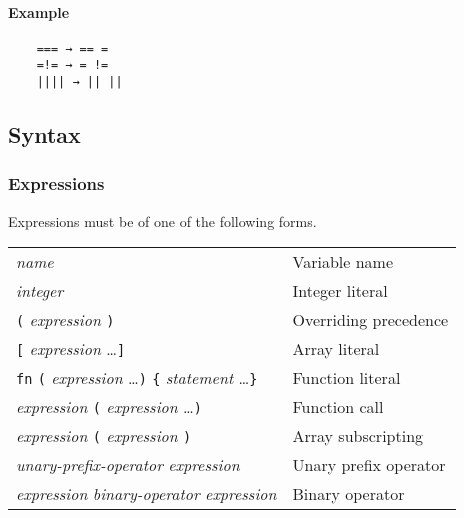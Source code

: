\paragraph{Example}

\begin{verbatim}
    === → == =
    =!= → = !=
    |||| → || ||
\end{verbatim}

\subsection{Syntax}

\subsubsection{Expressions}

Expressions must be of one of the following forms.

\begin{table}[H]
    \begin{tabular}{ l l }
        \textit{name}                                                                                      & Variable name         \\
        \textit{integer}                                                                                   & Integer literal       \\
        \verb|(| \textit{expression} \verb|)|                                                              & Overriding precedence \\
        \verb|[| \textit{expression} \ldots \verb|]|                                                       & Array literal         \\
        \verb|fn| \verb|(| \textit{expression} \ldots \verb|)| \verb|{| \textit{statement} \ldots \verb|}| & Function literal      \\
        \textit{expression} \verb|(| \textit{expression} \ldots \verb|)|                                   & Function call         \\
        \textit{expression} \verb|(| \textit{expression} \verb|)|                                          & Array subscripting    \\
        \textit{unary-prefix-operator} \textit{expression}                                                 & Unary prefix operator \\
        \textit{expression} \textit{binary-operator} \textit{expression}                                   & Binary operator
    \end{tabular}
\end{table}

